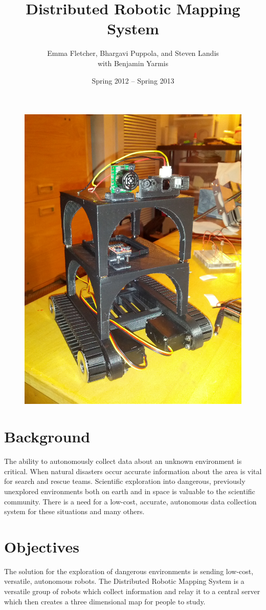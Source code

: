 \documentclass[10pt,letterpaper]{article}
\author{Emma Fletcher, Bhargavi Puppola, and Steven Landis\\ with Benjamin Yarmis}
\title{Distributed Robotic Mapping System}
\date{Spring 2012 -- Spring 2013}
\begin{document}
	\maketitle
	
	\hrulefill
	\vfill
	\begin{figure}[h!]
	\centering
		\includegraphics[width=.75\textwidth]{ApolloBuild}
	\end{figure}
	\vfill
	\newpage
	
	\section{Background}
	The ability to autonomously collect data about an unknown environment is critical. When natural disasters occur accurate information about the area is vital for search and rescue teams.  Scientific exploration into dangerous, previously unexplored environments both on earth and in space is valuable to the scientific community. There is a need for a low-cost, accurate, autonomous data collection system for these situations and many others.
	
	\section{Objectives}
	The solution for the exploration of dangerous environments is sending low-cost, versatile, autonomous robots. The Distributed Robotic Mapping System is a versatile group of robots which collect information and relay it to a central server which then creates a three dimensional map for people to study.
	
\end{document}
